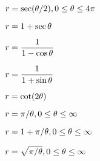 \exercise $\displaystyle r=\sec(\theta/2), 0\le\theta\le4\pi$
\endexercise

\exercise $\displaystyle r=1+\sec\theta$
\endexercise

\exercise $\displaystyle r={1\over 1-\cos\theta}$
\endexercise

\exercise $\displaystyle r={1\over 1+\sin\theta}$
\endexercise

\exercise $\displaystyle r=\cot(2\theta)$
\endexercise

\exercise $\displaystyle r=\pi/\theta, 0\le\theta\le\infty$
\endexercise

\exercise $\displaystyle r=1+\pi/\theta, 0\le\theta\le\infty$
\endexercise

\exercise $\displaystyle r=\sqrt{\pi/\theta}, 0\le\theta\le\infty$

\endtwocol
\endexercise

\endexercises


